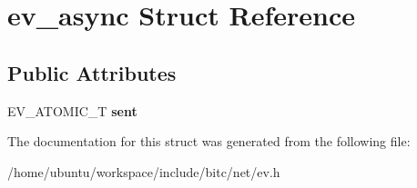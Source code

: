 \hypertarget{structev__async}{\section{ev\-\_\-async Struct Reference}
\label{structev__async}
}
\subsection*{Public Attributes}
\begin{DoxyCompactItemize}
\item 
\hypertarget{structev__async_a73b397e2c5756bff1403e9273e6dbaf3}{E\-V\-\_\-\-A\-T\-O\-M\-I\-C\-\_\-\-T {\bfseries sent}}\label{structev__async_a73b397e2c5756bff1403e9273e6dbaf3}

\end{DoxyCompactItemize}


The documentation for this struct was generated from the following file\-:\begin{DoxyCompactItemize}
\item 
/home/ubuntu/workspace/include/bitc/net/ev.\-h\end{DoxyCompactItemize}

